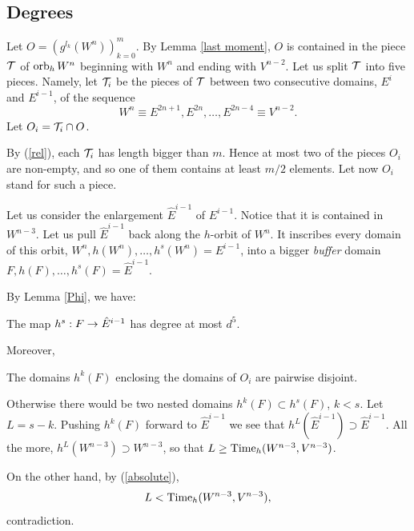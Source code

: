 \subsection{Degrees}
  
Let  $O= (g^{l_k} (W^n))_{k=0}^m$.
By Lemma \ref{last moment}, $O$ is contained in  the piece ${\cal T}$ of  $\operatorname{orb}_h W^n$
beginning with $W^n$ and ending with  $V^{n-2}$. 
Let us split ${\cal T}$ into five pieces.
 Namely, let ${\cal T}_i$  be the pieces of ${\cal T}$ between
two consecutive domains, $E^i$ and $E^{i-1}$, of the sequence  
\begin{equation}\label{domains}
                W^n \equiv  E^{2n+1}, E^{2n}, \dots , E^{2n-4} \equiv  V^{n-2}.
\end{equation}
Let $O_i= {\cal T}_i\cap O$.

By (\ref{rel}), each ${\cal T}_i$ has length bigger than  $m$.
Hence at most two of the pieces $O_i$ are non-empty, and so one of them
contains at least $m/2$ elements. Let now $O_i$ stand for such a piece.


Let us consider the enlargement $\hat E^{i-1}$ of $E^{i-1}$.
Notice that it is  contained in $W^{n-3}$. 
Let us pull  $\hat E^{i-1}$ back along the $h$-orbit of $W^n$.
It inscribes every domain of this orbit,  $W^n, h(W^n), \dots, h^s(W^n)= E^{i-1}$, 
into  a bigger {\it buffer} domain $F, h(F),\dots, h^s(F) = \hat E^{i-1}$. 

By Lemma \ref{Phi}, we have:

\begin{lem}\label{degree bound}
   The map $h^s: F \rightarrow \hat E^{i-1}$ has degree at most $d^5$.
\end{lem}

Moreover, 

\begin{lem}\label{disjoint}
   The domains $h^k(F)$ enclosing the domains of $O_i$ are pairwise disjoint.
\end{lem}

\begin{pf}
  Otherwise there would be two nested domains $h^k(F) \subset h^s (F)$, $k<s$. 
Let $L = s-k$. Pushing $h^k(F)$ forward to $\hat E^{i-1}$ we see that
$h^L (\hat E^{i-1})\supset \hat E^{i-1}$. All the more, $h^L (W^{n-3}) \supset W^{n-3}$,
so that $L \geq  \operatorname{Time}_h (W^{n-3}, V^{n-3})$.

On the other hand, by  (\ref{absolute}),
 $$
    L < \operatorname{Time}_h (W^{n-3}, V^{n-3}), 
$$
contradiction.
\end{pf}

